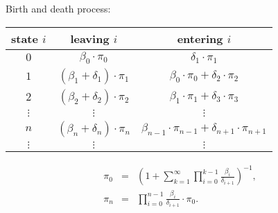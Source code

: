 \begin{example}
Birth and death process:

\begin{tabular}{|c|c|c|} \hline
  state $ i $ & leaving $ i $ & entering $ i $ \\ \hline
  $ 0 $ & $ \beta_{0} \cdot \pi_{0} $ & $ \delta_{1} \cdot \pi_{1} $ \\ \hline
  $ 1 $ & $ (\beta_{1} + \delta_{1}) \cdot \pi_{1} $ & $ \beta_{0} \cdot \pi_{0} + \delta_{2} \cdot \pi_{2} $ \\ \hline
  $ 2 $ & $ (\beta_{2} + \delta_{2}) \cdot \pi_{2} $ & $ \beta_{1} \cdot \pi_{1} + \delta_{3} \cdot \pi_{3} $ \\ \hline
  $ \vdots $ & $ \vdots $ & $ \vdots $ \\ \hline
  $ n $ & $ (\beta_{n} + \delta_{n}) \cdot \pi_{n} $ & $ \beta_{n - 1} \cdot \pi_{n - 1} + \delta_{n + 1} \cdot \pi_{n + 1} $ \\ \hline
  $ \vdots $ & $ \vdots $ & $ \vdots $ \\ \hline
\end{tabular}
\begin{eqnarray*}
\pi_{0} & = & \left( 1 + \sum_{k = 1}^{\infty} \prod_{i = 0}^{k - 1} \frac{\beta_{i}}{\delta_{i + 1}} \right)^{-1}, \\
\pi_{n} & = & \prod_{i = 0}^{n - 1} \frac{\beta_{i}}{\delta_{i + 1}} \cdot \pi_{0}.
\end{eqnarray*}
\end{example}
